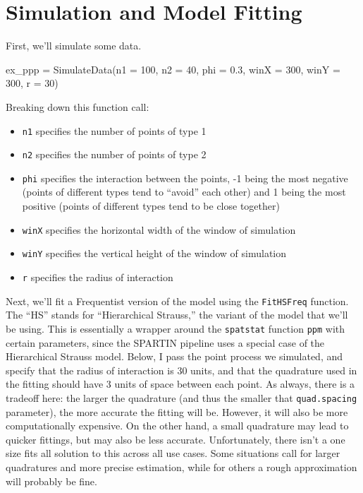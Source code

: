 \documentclass[
]{book}
\newenvironment{Shaded}{\begin{snugshade}}{\end{snugshade}}
\newcommand{\AttributeTok}[1]{\textcolor[rgb]{0.77,0.63,0.00}{#1}}
\newcommand{\DecValTok}[1]{\textcolor[rgb]{0.00,0.00,0.81}{#1}}
\newcommand{\FloatTok}[1]{\textcolor[rgb]{0.00,0.00,0.81}{#1}}
\newcommand{\FunctionTok}[1]{\textcolor[rgb]{0.00,0.00,0.00}{#1}}
\newcommand{\NormalTok}[1]{#1}
\newcommand{\OtherTok}[1]{\textcolor[rgb]{0.56,0.35,0.01}{#1}}
\providecommand{\tightlist}{%
  \setlength{\itemsep}{0pt}\setlength{\parskip}{0pt}}
\begin{document}
\hypertarget{simulation-and-model-fitting}{%
\section{Simulation and Model Fitting}\label{simulation-and-model-fitting}}

First, we'll simulate some data.

\begin{Shaded}
\begin{Highlighting}[]
\NormalTok{ex\_ppp }\OtherTok{=} \FunctionTok{SimulateData}\NormalTok{(}\AttributeTok{n1 =} \DecValTok{100}\NormalTok{, }\AttributeTok{n2 =} \DecValTok{40}\NormalTok{, }\AttributeTok{phi =} \FloatTok{0.3}\NormalTok{,}
                      \AttributeTok{winX =} \DecValTok{300}\NormalTok{, }\AttributeTok{winY =} \DecValTok{300}\NormalTok{, }\AttributeTok{r =} \DecValTok{30}\NormalTok{)}
\end{Highlighting}
\end{Shaded}

Breaking down this function call:

\begin{itemize}
\tightlist
\item
  \texttt{n1} specifies the number of points of type 1
\item
  \texttt{n2} specifies the number of points of type 2
\item
  \texttt{phi} specifies the interaction between the points, -1 being the most negative (points of different types tend to ``avoid'' each other) and 1 being the most positive (points of different types tend to be close together)
\item
  \texttt{winX} specifies the horizontal width of the window of simulation
\item
  \texttt{winY} specifies the vertical height of the window of simulation
\item
  \texttt{r} specifies the radius of interaction
\end{itemize}

Next, we'll fit a Frequentist version of the model using the \texttt{FitHSFreq} function. The ``HS'' stands for ``Hierarchical Strauss,'' the variant of the model that we'll be using. This is essentially a wrapper around the \texttt{spatstat} function \texttt{ppm} with certain parameters, since the SPARTIN pipeline uses a special case of the Hierarchical Strauss model. Below, I pass the point process we simulated, and specify that the radius of interaction is 30 units, and that the quadrature used in the fitting should have 3 units of space between each point. As always, there is a tradeoff here: the larger the quadrature (and thus the smaller that \texttt{quad.spacing} parameter), the more accurate the fitting will be. However, it will also be more computationally expensive. On the other hand, a small quadrature may lead to quicker fittings, but may also be less accurate. Unfortunately, there isn't a one size fits all solution to this across all use cases. Some situations call for larger quadratures and more precise estimation, while for others a rough approximation will probably be fine.
\end{document}
